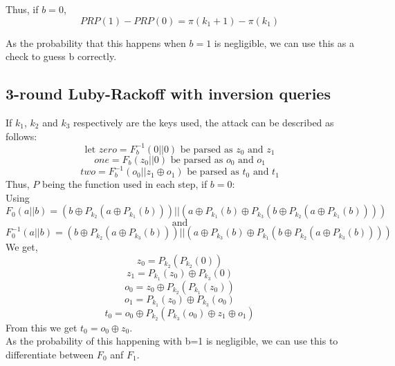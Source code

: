 \documentclass{article}
\begin{document}
Thus, if $b=0$,
\[PRP(1)-PRP(0)=\pi(k_1+1)-\pi(k_1)\]

As the probability that this happens when $b=1$ is negligible, we can use this as a check to guess b correctly.

 
\newpage
\subsection{3-round Luby-Rackoff with inversion queries}


If $k_1$, $k_2$ and $k_3$ respectively are the keys used, the attack can be described as follows:
\[\text{let }zero=F_b^{-1}(0||0) \text{ be parsed as }z_0\text{ and }z_1\]
\[one=F_b(z_0||0)\text{ be parsed as }o_0\text{ and }o_1\]
\[two=F_b^{-1}(o_0||z_1\oplus o_1)\text{ be parsed as }t_0\text{ and }t_1\]
Thus, $P$ being the function used in each step, if $b=0$:\\
Using
\[F_0(a||b)=(b \oplus P_{k_2}(a \oplus P_{k_1}(b)))||(a \oplus P_{k_1}(b) \oplus P_{k_3}(b \oplus P_{k_2}(a \oplus P_{k_1}(b))))\]
\[\text{and}\]
\[F_0^{-1}(a||b)=(b \oplus P_{k_2}(a \oplus P_{k_3}(b)))||(a \oplus P_{k_3}(b) \oplus P_{k_1}(b \oplus P_{k_2}(a \oplus P_{k_3}(b))))\]
We get,
\[z_0=P_{k_2}(P_{k_2}(0))\]
\[z_1=P_{k_1}(z_0)\oplus P_{k_3}(0)\]
\[o_0=z_0 \oplus P_{k_2}(P_{k_1}(z_0))\]
\[o_1=P_{k_1}(z_0)\oplus P_{k_3}(o_0)\]
\[t_0=o_0 \oplus P_{k_2}(P_{k_3}(o_0)\oplus z_1 \oplus o_1)\]
From this we get $t_0= o_0 \oplus z_0$.\\
As the probability of this happening with b=1 is negligible, we can use this to differentiate between $F_0$ anf $F_1$.







\newpage
\end{document}
